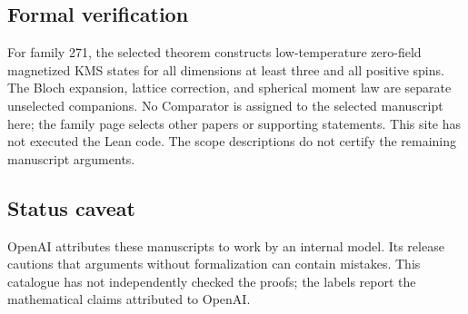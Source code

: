 \documentclass[11pt]{article}
\begin{document}
\subsection{Formal verification}
For family 271, the selected theorem constructs low-temperature zero-field magnetized KMS states for all dimensions at least three and all positive spins. The Bloch expansion, lattice correction, and spherical moment law are separate unselected companions. No Comparator is assigned to the selected manuscript here; the family page selects other papers or supporting statements. This site has not executed the Lean code. The scope descriptions do not certify the remaining manuscript arguments.

\subsection{Status caveat}
OpenAI attributes these manuscripts to work by an internal model. Its release cautions that arguments without formalization can contain mistakes. This catalogue has not independently checked the proofs; the labels report the mathematical claims attributed to OpenAI.
\end{document}
